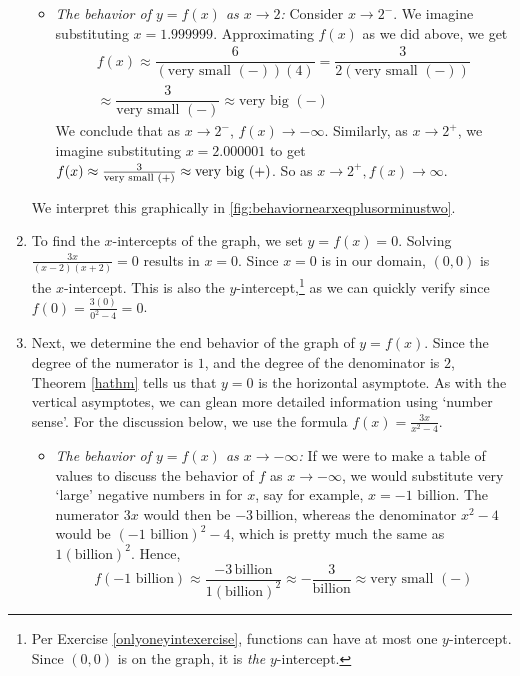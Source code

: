 \begin{ex}
\begin{enumerate}
\begin{itemize}
\item  \textit{The behavior of $y=f(x)$ as $x \rightarrow 2$:} Consider $x \rightarrow 2^{-}$. We imagine substituting $x = 1.999999$.  Approximating $f(x)$ as we did above, we get
\begin{multline*}
f(x) \approx \dfrac{6}{\left( \text{very small $(-)$}\right)(4)} = \dfrac{3}{2 \left( \text{very small $(-)$}\right)} \\
\approx \dfrac{3}{\text{very small $(-)$}} \approx \text{very big $(-)$}
\end{multline*}
We conclude that as $x \rightarrow 2^{-}$, $f(x) \rightarrow -\infty$.  Similarly, as $x \rightarrow 2^{+}$, we imagine substituting $x = 2.000001$ to get $f(x) \approx \frac{3}{\text{\scriptsize very small $(+)$}} \approx \text{very big (+)}$.  So as $x \rightarrow 2^{+}, f(x) \rightarrow \infty$.
\end{itemize}

We interpret this graphically in \autoref{fig:behaviornearxeqplusorminustwo}.

\item  To find the $x$-intercepts of the graph, we set $y=f(x) = 0$.  Solving $ \frac{3x}{(x-2)(x+2)} = 0$ results in $x=0$.  Since $x=0$ is in our domain, $(0,0)$ is the $x$-intercept.   This is also the $y$-intercept,\footnote{Per Exercise \ref{onlyoneyintexercise}, functions can have at most one $y$-intercept. Since $(0,0)$ is on the graph,  it is \textit{the} $y$-intercept.} as we can quickly verify since $f(0) = \frac{3(0)}{0^2-4} = 0$.


\item  Next, we determine the end behavior of the graph of $y=f(x)$.  Since the degree of the numerator is $1$, and the degree of the denominator is $2$, Theorem \ref{hathm} tells us that $y=0$ is the horizontal asymptote.  As with the vertical asymptotes, we can glean more detailed information using `number sense'. For the discussion below, we use the formula $f(x) = \frac{3x}{x^2-4}$. 

\begin{itemize}

\item  \textit{The behavior of $y=f(x)$ as $x \rightarrow -\infty$:}  If we were to make a table of values to discuss the behavior of $f$ as $x \rightarrow -\infty$, we would substitute very `large' negative numbers in for $x$, say for example, $x = \text{$-1$ billion}$.  The numerator $3x$ would then be $-3 \, \text{billion}$, whereas the denominator $x^2-4$ would be $(\text{$-1$ billion})^2 - 4$, which is pretty much the same as  $1(\text{billion})^2$.  Hence, \[f\left(\text{$-1$ billion}\right) \approx \dfrac{-3 \, \text{billion}}{1(\text{billion})^2} \approx - \dfrac{3}{\text{billion}} \approx \text{very small $(-)$} \]


\end{itemize}
\end{enumerate}
\end{ex}
